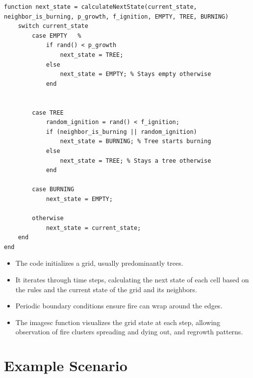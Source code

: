 \documentclass{article}
\begin{document}
\begin{lstlisting}[caption={Helper functions}]
function next_state = calculateNextState(current_state, neighbor_is_burning, p_growth, f_ignition, EMPTY, TREE, BURNING)
    switch current_state
        case EMPTY   % 
            if rand() < p_growth
                next_state = TREE;
            else
                next_state = EMPTY; % Stays empty otherwise
            end


        case TREE   
            random_ignition = rand() < f_ignition;
            if (neighbor_is_burning || random_ignition)
                next_state = BURNING; % Tree starts burning
            else
                next_state = TREE; % Stays a tree otherwise
            end
            
        case BURNING 
            next_state = EMPTY;
            
        otherwise 
            next_state = current_state; 
    end
end
\end{lstlisting}

\begin{itemize}
\item The code initializes a grid, usually predominantly trees.
\item It iterates through time steps, calculating the next state of each cell based on the rules and the current state of the grid and its neighbors.
\item Periodic boundary conditions ensure fire can wrap around the edges.
\item The imagesc function visualizes the grid state at each step, allowing observation of fire clusters spreading and dying out, and regrowth patterns.
\end{itemize}

\section{Example Scenario }
\end{document}
